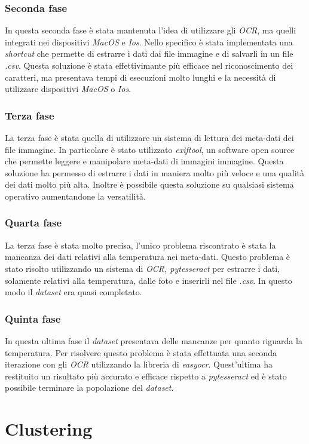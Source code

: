 \documentclass[12pt,a4paper,twoside]{article}
\begin{document}
\subsubsection{Seconda fase}
In questa seconda fase è stata mantenuta l'idea di utilizzare gli \textit{OCR}, ma quelli integrati nei dispositivi \textit{MacOS} e \textit{Ios}. Nello specifico è stata implementata una \textit{shortcut} che permette di estrarre i dati dai file immagine e di salvarli in un file \textit{.csv}. Questa soluzione è stata effettivimante più efficace nel riconoscimento dei caratteri, ma presentava tempi di esecuzioni molto lunghi e la necessità di utilizzare dispositivi \textit{MacOS} o \textit{Ios}.

\subsubsection{Terza fase}
La terza fase è stata quella di utilizzare un sistema di lettura dei meta-dati dei file immagine. In particolare è stato utilizzato \textit{exiftool}, un software open source che permette leggere e manipolare meta-dati di immagini immagine. Questa soluzione ha permesso di estrarre i dati in maniera molto più veloce e una qualità dei dati molto più alta. Inoltre è possibile questa soluzione su qualsiasi sistema operativo aumentandone la versatilità.
\subsubsection{Quarta fase}
La terza fase è stata molto precisa, l'unico problema riscontrato è stata la mancanza dei dati relativi alla temperatura nei meta-dati. Questo problema è stato risolto utilizzando un sistema di \textit{OCR, pytesseract} per estrarre i dati, solamente relativi alla temperatura, dalle foto e inserirli nel file \textit{.csv}. In questo modo il \textit{dataset} era quasi completato.
\subsubsection{Quinta fase}
In questa ultima fase il \textit{dataset} presentava delle mancanze per quanto riguarda la temperatura. Per risolvere questo problema è stata effettuata una seconda iterazione con gli \textit{OCR} utilizzando la libreria di \textit{easyocr}. Quest'ultima ha restituito un risultato più accurato e efficace rispetto a \textit{pytesseract} ed è stato possibile terminare la popolazione del \textit{dataset}.
\section{Clustering}
\end{document}
